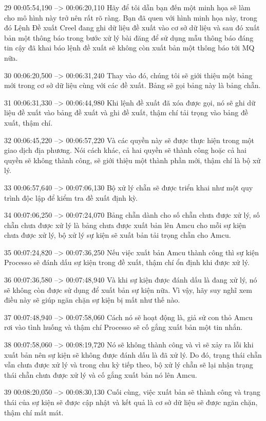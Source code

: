 29
00:05:54,190 --> 00:06:20,110
Hãy để tôi dẫn bạn đến một minh họa sẽ làm cho mô hình này trở nên rất rõ ràng.  Bạn đã quen với hình minh họa này, trong đó Lệnh Đề xuất Creel đang ghi dữ liệu đề xuất vào cơ sở dữ liệu và sau đó xuất bản một thông báo trong bước xử lý bài đăng để sử dụng mẫu thông báo đáng tin cậy đã khai báo lệnh đề xuất sẽ không còn xuất bản một thông báo tới MQ nữa.

30
00:06:20,500 --> 00:06:31,240
Thay vào đó, chúng tôi sẽ giới thiệu một bảng mới trong cơ sở dữ liệu cùng với các đề xuất.  Bảng sẽ gọi bảng này là bảng chẵn.

31
00:06:31,330 --> 00:06:44,980
Khi lệnh đề xuất đã xóa được gọi, nó sẽ ghi dữ liệu đề xuất vào bảng đề xuất và ghi đề xuất, thậm chí tải trọng vào bảng đề xuất, thậm chí.

32
00:06:45,220 --> 00:06:57,220
Và các quyền này sẽ được thực hiện trong một giao dịch địa phương.  Nói cách khác, cả hai quyền sẽ thành công hoặc cả hai quyền sẽ không thành công, sẽ giới thiệu một thành phần mới, thậm chí là bộ xử lý.

33
00:06:57,640 --> 00:07:06,130
Bộ xử lý chẵn sẽ được triển khai như một quy trình độc lập để kiểm tra đề xuất định kỳ.

34
00:07:06,250 --> 00:07:24,070
Bảng chẵn dành cho số chẵn chưa được xử lý, số chẵn chưa được xử lý là bảng chưa được xuất bản lên Amcu cho mỗi sự kiện chưa được xử lý, bộ xử lý sự kiện sẽ xuất bản tải trọng chẵn cho Amcu.

35
00:07:24,820 --> 00:07:36,250
Nếu việc xuất bản Amcu thành công thì sự kiện Processo sẽ đánh dấu sự kiện trong đề xuất, thậm chí ổn định khi được xử lý.

36
00:07:36,580 --> 00:07:48,940
Và khi sự kiện được đánh dấu là đang xử lý, nó sẽ không còn được sử dụng để xuất bản sự kiện nữa.  Vì vậy, hãy suy nghĩ xem điều này sẽ giúp ngăn chặn sự kiện bị mất như thế nào.

37
00:07:48,940 --> 00:07:58,060
Cách nó sẽ hoạt động là, giả sử con thỏ Amcu rơi vào tình huống và thậm chí Processo sẽ cố gắng xuất bản một tin nhắn.

38
00:07:58,060 --> 00:08:19,720
Nó sẽ không thành công và vì sẽ xảy ra lỗi khi xuất bản nên sự kiện sẽ không được đánh dấu là đã xử lý.  Do đó, trạng thái chẵn vẫn chưa được xử lý và trong chu kỳ tiếp theo, bộ xử lý chẵn sẽ lại nhận trạng thái chẵn chưa được xử lý và cố gắng xuất bản nó lên Amcu.

39
00:08:20,050 --> 00:08:30,130
Cuối cùng, việc xuất bản sẽ thành công và trạng thái của sự kiện sẽ được cập nhật và kết quả là cơ sở dữ liệu sẽ được ngăn chặn, thậm chí mất mát.

